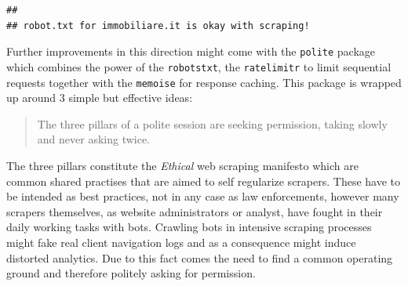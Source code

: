 \documentclass[
  12pt,
  a4paper,
  oneside]{book}
\newenvironment{Shaded}{\begin{snugshade}}{\end{snugshade}}
\newcommand{\CharTok}[1]{\textcolor[rgb]{0.31,0.60,0.02}{#1}}
\newcommand{\CommentTok}[1]{\textcolor[rgb]{0.56,0.35,0.01}{\textit{#1}}}
\newcommand{\ControlFlowTok}[1]{\textcolor[rgb]{0.13,0.29,0.53}{\textbf{#1}}}
\newcommand{\DataTypeTok}[1]{\textcolor[rgb]{0.13,0.29,0.53}{#1}}
\newcommand{\DecValTok}[1]{\textcolor[rgb]{0.00,0.00,0.81}{#1}}
\newcommand{\KeywordTok}[1]{\textcolor[rgb]{0.13,0.29,0.53}{\textbf{#1}}}
\newcommand{\NormalTok}[1]{#1}
\newcommand{\OperatorTok}[1]{\textcolor[rgb]{0.81,0.36,0.00}{\textbf{#1}}}
\newcommand{\StringTok}[1]{\textcolor[rgb]{0.31,0.60,0.02}{#1}}
\begin{document}
\begin{Shaded}
\end{Shaded}

\begin{verbatim}
## 
## robot.txt for immobiliare.it is okay with scraping!
\end{verbatim}

Further improvements in this direction might come with the \texttt{polite} package \citep{polite} which combines the power of the \texttt{robotstxt}, the \texttt{ratelimitr} \citep{ratelimitr} to limit sequential requests together with the \texttt{memoise} \citep{memoise} for response caching. This package is wrapped up around 3 simple but effective ideas:

\begin{quote}
The three pillars of a polite session are seeking permission, taking slowly and never asking twice.
\end{quote}

The three pillars constitute the \emph{Ethical} web scraping manifesto \citep{densmore_2019} which are common shared practises that are aimed to self regularize scrapers. These have to be intended as best practices, not in any case as law enforcements, however many scrapers themselves, as website administrators or analyst, have fought in their daily working tasks with bots. Crawling bots in intensive scraping processes might fake real client navigation logs and as a consequence might induce distorted analytics. Due to this fact comes the need to find a common operating ground and therefore politely asking for permission.
\end{document}
